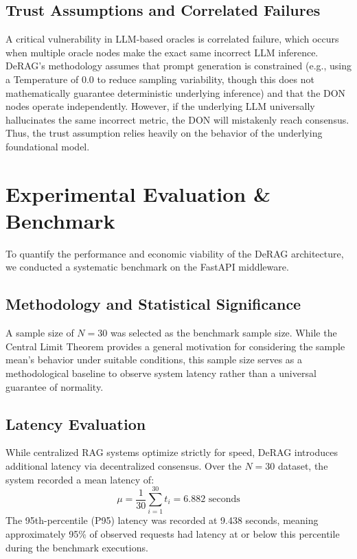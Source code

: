 \documentclass[11pt,a4paper]{article}
\begin{document}
\subsection{Trust Assumptions and Correlated Failures}
A critical vulnerability in LLM-based oracles is correlated failure, which occurs when multiple oracle nodes make the exact same incorrect LLM inference. DeRAG's methodology assumes that prompt generation is constrained (e.g., using a Temperature of 0.0 to reduce sampling variability, though this does not mathematically guarantee deterministic underlying inference) and that the DON nodes operate independently. However, if the underlying LLM universally hallucinates the same incorrect metric, the DON will mistakenly reach consensus. Thus, the trust assumption relies heavily on the behavior of the underlying foundational model.

\section{Experimental Evaluation \& Benchmark}
To quantify the performance and economic viability of the DeRAG architecture, we conducted a systematic benchmark on the FastAPI middleware.

\subsection{Methodology and Statistical Significance}
A sample size of $N=30$ was selected as the benchmark sample size. While the Central Limit Theorem provides a general motivation for considering the sample mean's behavior under suitable conditions, this sample size serves as a methodological baseline to observe system latency rather than a universal guarantee of normality.

\subsection{Latency Evaluation}
While centralized RAG systems optimize strictly for speed, DeRAG introduces additional latency via decentralized consensus. Over the $N=30$ dataset, the system recorded a mean latency of:
\begin{equation}
    \mu = \frac{1}{30} \sum_{i=1}^{30} t_i = 6.882\text{ seconds}
\end{equation}
The 95th-percentile (P95) latency was recorded at 9.438 seconds, meaning approximately 95\% of observed requests had latency at or below this percentile during the benchmark executions.
\end{document}
